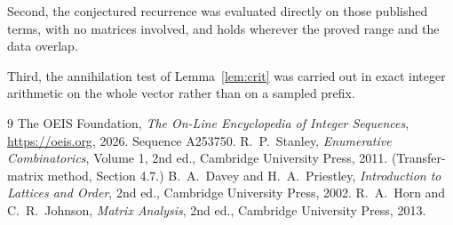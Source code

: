 \documentclass[11pt,a4paper]{article}
\theoremstyle{plain}
\theoremstyle{definition}
\begin{document}
Second, the conjectured recurrence was evaluated directly on those published terms, with no
matrices involved, and holds wherever the proved range and the data overlap.

Third, the annihilation test of Lemma~\ref{lem:crit} was carried out in exact integer
arithmetic on the whole vector rather than on a sampled prefix.

\begin{thebibliography}{9}
 The OEIS Foundation, \emph{The On-Line Encyclopedia of Integer
Sequences}, \url{https://oeis.org}, 2026. Sequence A253750.
 R.~P.~Stanley, \emph{Enumerative Combinatorics}, Volume 1, 2nd ed.,
Cambridge University Press, 2011. (Transfer-matrix method, Section 4.7.)
 B.~A.~Davey and H.~A.~Priestley, \emph{Introduction to Lattices and
Order}, 2nd ed., Cambridge University Press, 2002.
 R.~A.~Horn and C.~R.~Johnson, \emph{Matrix Analysis}, 2nd ed., Cambridge
University Press, 2013.
\end{thebibliography}
\end{document}
